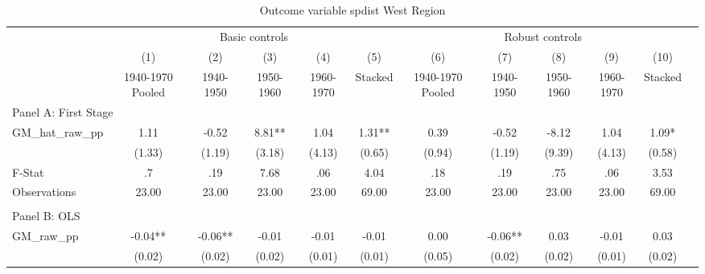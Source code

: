  \begin{table}[htbp]\centering {} \begin{threeparttable} \caption{Outcome variable spdist West Region} \begin{tabular}{l*{11}{c}} \toprule
          &\multicolumn{5}{c}{Basic controls}                                   &\multicolumn{5}{c}{Robust controls}                                  \\\cmidrule(lr){2-6}\cmidrule(lr){7-11}
          &\multicolumn{1}{c}{(1)}&\multicolumn{1}{c}{(2)}&\multicolumn{1}{c}{(3)}&\multicolumn{1}{c}{(4)}&\multicolumn{1}{c}{(5)}&\multicolumn{1}{c}{(6)}&\multicolumn{1}{c}{(7)}&\multicolumn{1}{c}{(8)}&\multicolumn{1}{c}{(9)}&\multicolumn{1}{c}{(10)}\\
          &\multicolumn{1}{c}{1940-1970 Pooled}&\multicolumn{1}{c}{1940-1950}&\multicolumn{1}{c}{1950-1960}&\multicolumn{1}{c}{1960-1970}&\multicolumn{1}{c}{Stacked}&\multicolumn{1}{c}{1940-1970 Pooled}&\multicolumn{1}{c}{1940-1950}&\multicolumn{1}{c}{1950-1960}&\multicolumn{1}{c}{1960-1970}&\multicolumn{1}{c}{Stacked}\\
\cmidrule(lr){1-11}
\multicolumn{10}{l}{Panel A: First Stage}\\
\cmidrule(lr){1-11}
GM\_hat\_raw\_pp&      1.11   &     -0.52   &      8.81** &      1.04   &      1.31** &      0.39   &     -0.52   &     -8.12   &      1.04   &      1.09*  \\
          &    (1.33)   &    (1.19)   &    (3.18)   &    (4.13)   &    (0.65)   &    (0.94)   &    (1.19)   &    (9.39)   &    (4.13)   &    (0.58)   \\
\midrule
F-Stat    &        .7   &       .19   &      7.68   &       .06   &      4.04   &       .18   &       .19   &       .75   &       .06   &      3.53   \\
Observations&     23.00   &     23.00   &     23.00   &     23.00   &     69.00   &     23.00   &     23.00   &     23.00   &     23.00   &     69.00   \\
\cmidrule[\heavyrulewidth](lr){1-11} \\ \cmidrule[\heavyrulewidth](lr){1-11}
\multicolumn{10}{l}{Panel B: OLS}\\
\cmidrule(lr){1-11}
GM\_raw\_pp &     -0.04** &     -0.06** &     -0.01   &     -0.01   &     -0.01   &      0.00   &     -0.06** &      0.03   &     -0.01   &      0.03   \\
          &    (0.02)   &    (0.02)   &    (0.02)   &    (0.01)   &    (0.01)   &    (0.05)   &    (0.02)   &    (0.02)   &    (0.01)   &    (0.02)   \\

\end{tabular}
\end{threeparttable}
\end{table}
